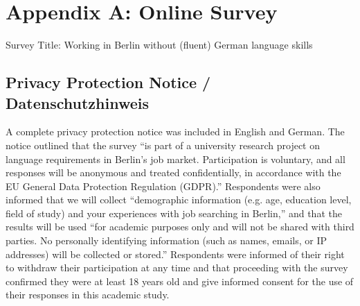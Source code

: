 \section{Appendix A: Online Survey}

\noindent Survey Title: Working in Berlin without (fluent) German language skills

\subsection{Privacy Protection Notice / Datenschutzhinweis}

A complete privacy protection notice was included in English and German. The notice outlined that the survey “is part of a university research project on language requirements in Berlin’s job market. Participation is voluntary, and all responses will be anonymous and treated confidentially, in accordance with the EU General Data Protection Regulation (GDPR).” Respondents were also informed that we will collect “demographic information (e.g. age, education level, field of study) and your experiences with job searching in Berlin,” and that the results will be used “for academic purposes only and will not be shared with third parties. No personally identifying information (such as names, emails, or IP addresses) will be collected or stored.” Respondents were informed of their right to withdraw their participation at any time and that proceeding with the survey confirmed they were at least 18 years old and give informed consent for the use of their responses in this academic study.

